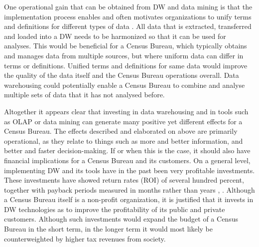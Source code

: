 One operational gain that can be obtained from DW and data mining is that the implementation process enables and often motivates organizations to
unify terms and definitions for different types of data \cite{l2video}. 
All data that is extracted, transferred and loaded into a DW needs to be harmonized so that it can be used for analyses. 
This would be beneficial for a Census Bureau, which typically obtains and manages data from multiple sources, 
but where uniform data can differ in terms or definitions. 
Unified terms and definitions for same data would improve the quality of the data itself and the Census Bureau operations overall.
Data warehousing could potentially enable a Census Bureau to combine and analyse multiple sets of data that it has not analysed before.

Altogether it appears clear that investing in data warehousing and in tools such as OLAP or data mining can generate many positive yet 
different effects for a Census Bureau. 
The effects described and elaborated on above are primarily operational, as they relate to things such as more and better information,
and better and faster decision-making. 
If or when this is the case, it should also have financial implications for a Census Bureau and its customers.
On a general level, implementing DW and its tools have in the past been very profitable investments. 
These investments have showed return rates (ROI) of several hundred percent,
together with payback periods measured in months rather than years \cite[chapter~31.1.3]{CourseLitt}, \cite{l2video}. 
Although a Census Bureau itself is a non-profit organization, 
it is justified that it invests in DW technologies as to improve the profitability of its public and private customers. 
Although such investments would expand the budget of a Census Bureau in the short term, 
in the longer term it would most likely be counterweighted by higher tax revenues from society.